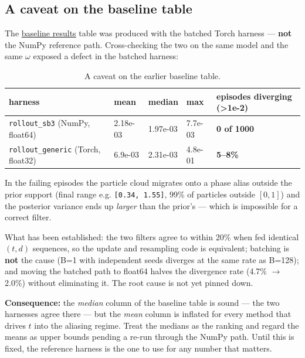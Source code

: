 \documentclass[12pt,a4paper]{article}
\begin{document}
\FloatBarrier
\subsection{A caveat on the baseline table}\label{sec:a-caveat-on-the-earlier-baseline-table}
The \hyperref[sec:baseline-results]{baseline results} table was produced with the batched Torch harness --- \textbf{not} the NumPy reference path. Cross-checking the two on the same model and the same $\omega$ exposed a defect in the batched harness:

\begin{table}[H]
  \centering
  \caption{A caveat on the earlier baseline table.}
  \label{tab:a-caveat-on-the-earlier-baseline-table}
  \footnotesize
  \begin{tabular}{lllll}
  \toprule
  harness & mean & median & max & episodes diverging (>1e-2) \\
  \midrule
  \texttt{rollout\_\allowbreak{}sb3} (NumPy, float64) & 2.18e-03 & 1.97e-03 & 7.7e-03 & \textbf{0 of 1000} \\
  \texttt{rollout\_\allowbreak{}generic} (Torch, float32) & 6.9e-03 & 2.31e-03 & 4.8e-01 & \textbf{5--8\%} \\
  \bottomrule
  \end{tabular}
\end{table}
In the failing episodes the particle cloud migrates onto a phase alias outside the prior support (final range e.g. \texttt{[0.\allowbreak{}34, 1.\allowbreak{}55]}, 99\% of particles outside $[0,1]$) and the posterior variance ends up \emph{larger} than the prior's --- which is impossible for a correct filter.

What has been established: the two filters agree to within 20\% when fed identical $(t, d)$ sequences, so the update and resampling code is equivalent; batching is \textbf{not} the cause (B=1 with independent seeds diverges at the same rate as B=128); and moving the batched path to float64 halves the divergence rate (4.7\% $\rightarrow$ 2.0\%) without eliminating it. The root cause is not yet pinned down.

\textbf{Consequence:} the \emph{median} column of the baseline table is sound --- the two harnesses agree there --- but the \emph{mean} column is inflated for every method that drives $t$ into the aliasing regime. Treat the medians as the ranking and regard the means as upper bounds pending a re-run through the NumPy path. Until this is fixed, the reference harness is the one to use for any number that matters.
\end{document}
